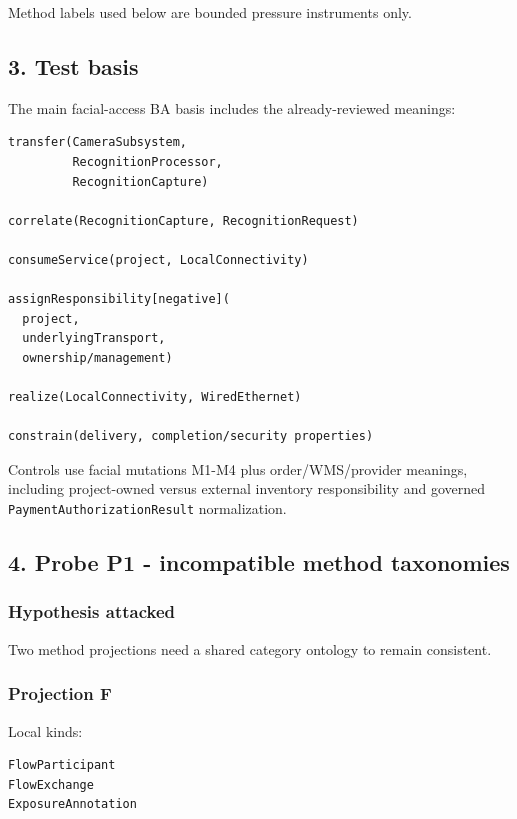 \documentclass[11pt,a4paper]{article}
\begin{document}
Method labels used below are bounded pressure instruments only.

\subsection{3. Test basis}\label{3-test-basis}

The main facial-access BA basis includes the already-reviewed meanings:

\begin{verbatim}
transfer(CameraSubsystem,
         RecognitionProcessor,
         RecognitionCapture)

correlate(RecognitionCapture, RecognitionRequest)

consumeService(project, LocalConnectivity)

assignResponsibility[negative](
  project,
  underlyingTransport,
  ownership/management)

realize(LocalConnectivity, WiredEthernet)

constrain(delivery, completion/security properties)
\end{verbatim}

Controls use facial mutations M1-M4 plus order/WMS/provider meanings,
including project-owned versus external inventory responsibility and
governed \texttt{PaymentAuthorizationResult} normalization.

\subsection{4. Probe P1 - incompatible method
taxonomies}\label{4-probe-p1---incompatible-method-taxonomies}

\subsubsection{Hypothesis attacked}\label{hypothesis-attacked}

Two method projections need a shared category ontology to remain
consistent.

\subsubsection{Projection F}\label{projection-f}

Local kinds:

\begin{verbatim}
FlowParticipant
FlowExchange
ExposureAnnotation
\end{verbatim}
\end{document}
